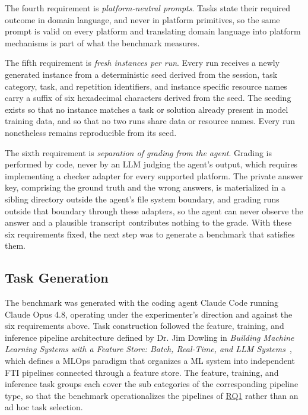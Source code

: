 \documentclass[
english,                 %
bibtex,                  %
]{kththesis}
\numberwithin{listing}{chapter}
\begin{document}
The fourth requirement is \emph{platform-neutral prompts}. Tasks state their required outcome in domain language, and never in platform primitives, so the same prompt is valid on every platform and translating domain language into platform mechanisms is part of what the benchmark measures.

The fifth requirement is \emph{fresh instances per run}. Every run receives a newly generated instance from a deterministic seed derived from the session, task category, task, and repetition identifiers, and instance specific resource names carry a suffix of six hexadecimal characters derived from the seed. The seeding exists so that no instance matches a task or solution already present in model training data, and so that no two runs share data or resource names. Every run nonetheless remains reproducible from its seed.

The sixth requirement is \emph{separation of grading from the agent}. Grading is performed by code, never by an \gls{LLM} judging the agent's output, which requires implementing a checker adapter for every supported platform. The private answer key, comprising the ground truth and the wrong answers, is materialized in a sibling directory outside the agent's file system boundary, and grading runs outside that boundary through these adapters, so the agent can never observe the answer and a plausible transcript contributes nothing to the grade. With these six requirements fixed, the next step was to generate a benchmark that satisfies them.

\subsection{Task Generation}
\label{sec:method_task_generation}
\glsresetall

The benchmark was generated with the coding agent Claude Code running Claude Opus 4.8, operating under the experimenter's direction and against the six requirements above. Task construction followed the feature, training, and inference pipeline architecture defined by Dr. Jim Dowling in \emph{Building Machine Learning Systems with a Feature Store: Batch, Real-Time, and \Gls{LLM} Systems}~\cite{jim_dowling_building_2025}, which defines a \gls{MLOps} paradigm that organizes a \gls{ML} system into independent \gls{FTI} pipelines connected through a feature store. The feature, training, and inference task groups each cover the sub categories of the corresponding pipeline type, so that the benchmark operationalizes the pipelines of \hyperref[rq1]{RQ1} rather than an ad hoc task selection.
\end{document}
